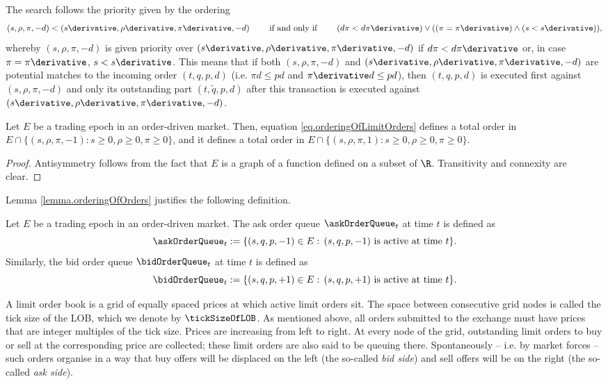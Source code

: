 The search follows the priority given by the ordering
\begin{equation}
\label{eq.orderingOfLimitOrders}
 (s,\rho,\pi,-d)<(s\derivative,\rho\derivative,\pi\derivative,-d)
 \qquad
 \text{ if and only if }
 \qquad
 (d\pi<d\pi\derivative)\vee((\pi=\pi\derivative)\wedge(s<s\derivative)),
\end{equation}
whereby $(s,\rho,\pi,-d)$ is given priority over $(s\derivative,\rho\derivative,\pi\derivative,-d)$
if $ d\pi<d\pi\derivative$ or, in case $\pi=\pi\derivative$, $s<s\derivative$.
This means that if both $(s,\rho,\pi,-d)$ and $(s\derivative,\rho\derivative,\pi\derivative,-d)$
are potential matches to the incoming order $(t, q,p,d)$
(i.e.
$\pi d \leq p d$ and
$\pi\derivative d \leq p d$),
then
$(t, q, p, d)$ is executed first against $(s, \rho, \pi, -d)$
and only its outstanding part $(t, \tilde{q}, p, d)$ after this transaction
is executed against $(s\derivative, \rho\derivative, \pi\derivative, -d)$.

\begin{lemma}
\label{lemma.orderingOfOrders}
Let $E$ be a trading epoch in an order-driven market.
Then, equation \eqref{eq.orderingOfLimitOrders} defines a total order in
$E\cap \lbrace (s,\rho,\pi,-1): s\geq0, \rho\geq0,\pi\geq0\rbrace$,
and it defines a total order in
$E\cap \lbrace (s,\rho,\pi,1): s\geq0, \rho\geq0,\pi\geq0\rbrace$.
\end{lemma}
\begin{proof}
 Antisymmetry follows from the fact that $E$ is a graph of a function defined on a subset of $\R$.
 Transitivity and connexity are clear.
\end{proof}
Lemma \ref{lemma.orderingOfOrders} justifies the following definition.
\begin{defi}
\label{def.orderQueue}
 Let $E$ be a trading epoch in an order-driven market.
 The ask order queue $\askOrderQueue_t$ at time $t$ is defined as
 \begin{equation*}
  \askOrderQueue_t := \lbrace (s,q,p,-1)\in E : \, (s,q,p,-1) \text{ is active at time } t \rbrace.
 \end{equation*}
 Similarly, the bid order queue $\bidOrderQueue_t$ at time $t$ is defined as
 \begin{equation*}
  \bidOrderQueue_t := \lbrace (s,q,p,+1) \in E : \, (s,q,p,+1) \text{ is active at time } t \rbrace.
 \end{equation*}
\end{defi}

A limit order book is a grid of equally spaced prices at which active limit orders sit.
The space between consecutive grid nodes is called the tick size of the LOB,
which we denote by $\tickSizeOfLOB$.
As mentioned above,
all orders submitted to the exchange must have prices that are integer multiples of the tick size.
Prices are increasing from left to right.
At every node of the grid,
outstanding limit orders to buy or sell at the corresponding price are collected;
these limit orders are also said to be queuing there.
Spontaneously -- i.e.
by market forces -- such orders organise in a way that
buy offers will be displaced on the left (the so-called \emph{bid side})
and sell offers will be on the right (the so-called \emph{ask side}).

